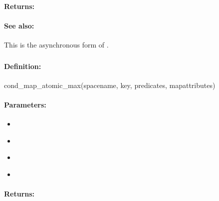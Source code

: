 \paragraph{Returns:}


\paragraph{See also:}  This is the asynchronous form of .

\pagebreak
\subsubsection{}
\label{api:ruby:cond_map_atomic_max}


\paragraph{Definition:}
\begin{rubycode}
cond_map_atomic_max(spacename, key, predicates, mapattributes)
\end{rubycode}

\paragraph{Parameters:}
\begin{itemize}[noitemsep]
\item {}\\

\item {}\\

\item {}\\

\item {}\\

\end{itemize}

\paragraph{Returns:}


